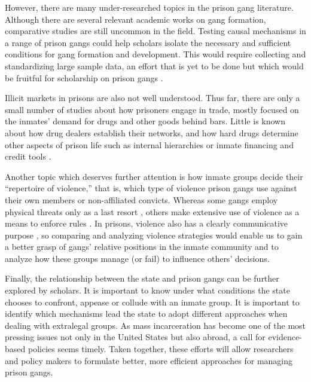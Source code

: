 \documentclass[a4paper, 12pt]{article}
\begin{document}
However, there are many under-researched topics in the prison gang literature. Although there are several relevant academic works on gang formation, comparative studies are still uncommon in the field. Testing causal mechanisms in a range of prison gangs could help scholars isolate the necessary and sufficient conditions for gang formation and development. This would require collecting and standardizing large sample data, an effort that is yet to be done but which would be fruitful for scholarship on prison gangs \citep{fleisher2001overview}.

Illicit markets in prisons are also not well understood. Thus far, there are only a small number of studies about how prisoners engage in trade, mostly focused on the inmates' demand for drugs and other goods behind bars. Little is known about how drug dealers establish their networks, and how hard drugs determine other aspects of prison life such as internal hierarchies or inmate financing and credit tools \citep[p. 348]{crewe2006prison}. 

Another topic which deserves further attention is how inmate groups decide their ``repertoire of violence,'' that is, which type of violence prison gangs use against their own members or non-affiliated convicts. Whereas some gangs employ physical threats only as a last resort \citep{crewe2006prison,trammell2012enforcing}, others make extensive use of violence as a means to enforce rules \citep{dias2009guerra,lessing2014build}. In prisons, violence also has a clearly communicative purpose \citep{gambetta2009codes}, so comparing and analyzing violence strategies would enable us to gain a better grasp of gangs' relative positions in the inmate community and to analyze how these groups manage (or fail) to influence others' decisions.

Finally, the relationship between the state and prison gangs can be further explored by scholars. It is important to know under what conditions the state chooses to confront, appease or collude with an inmate group. It is important to identify which mechanisms lead the state to adopt different approaches when dealing with extralegal groups. As mass incarceration has become one of the most pressing issues not only in the United States but also abroad, a call for evidence-based policies seems timely. Taken together, these efforts will allow researchers and policy makers to formulate better, more efficient approaches for managing prison gangs.


\newpage



\end{document}
